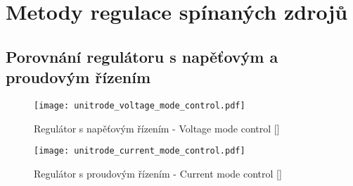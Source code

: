 {   %
    

  \section{Metody regulace spínaných zdrojů}\label{aes:sec008}
    \subsection{Porovnání regulátoru s napěťovým a proudovým řízením}
      \begin{figure}[ht!]
        \centering
        \texttt{[image: unitrode\_voltage\_mode\_control.pdf]}
        \caption[Regulátor s napěťovým řízením]{Regulátor s napěťovým řízením - Voltage mode
                 control [\cite{SLUA119}]}
        \label{ENZ:fig_V_mode_cntrl}
      \end{figure}
  
  
      \begin{figure}[ht!]
        \centering
        \texttt{[image: unitrode\_current\_mode\_control.pdf]}
        \caption[Regulátor s proudovým řízením]{Regulátor s proudovým řízením - Current mode
                 control [\cite{SLUA119}]}
        \label{ENZ:fig_I_mode_cntrl}
      \end{figure}
  
}
